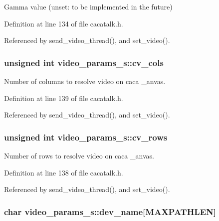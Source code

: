 \-Gamma value (unset\-: to be implemented in the future) 



\-Definition at line 134 of file cacatalk.\-h.



\-Referenced by send\-\_\-video\-\_\-thread(), and set\-\_\-video().

\hypertarget{structvideo__params__s_aa3f695f161a6cc97cdbfbcc7405323ec}{
\subsubsection[{cv\-\_\-cols}]{\setlength{\rightskip}{0pt plus 5cm}unsigned int {\bf video\-\_\-params\-\_\-s\-::cv\-\_\-cols}}}\label{structvideo__params__s_aa3f695f161a6cc97cdbfbcc7405323ec}


\-Number of columns to resolve video on caca \-\_\-anvas. 



\-Definition at line 139 of file cacatalk.\-h.



\-Referenced by send\-\_\-video\-\_\-thread(), and set\-\_\-video().

\hypertarget{structvideo__params__s_aec78c2ac6a99bfb627d77fe7c533541d}{
\subsubsection[{cv\-\_\-rows}]{\setlength{\rightskip}{0pt plus 5cm}unsigned int {\bf video\-\_\-params\-\_\-s\-::cv\-\_\-rows}}}\label{structvideo__params__s_aec78c2ac6a99bfb627d77fe7c533541d}


\-Number of rows to resolve video on caca \-\_\-anvas. 



\-Definition at line 138 of file cacatalk.\-h.



\-Referenced by send\-\_\-video\-\_\-thread(), and set\-\_\-video().

\hypertarget{structvideo__params__s_a7c8bdb370066b647e33e0a84bbca5911}{
\subsubsection[{dev\-\_\-name}]{\setlength{\rightskip}{0pt plus 5cm}char {\bf video\-\_\-params\-\_\-s\-::dev\-\_\-name}\mbox{[}\-M\-A\-X\-P\-A\-T\-H\-L\-E\-N\mbox{]}}}\label{structvideo__params__s_a7c8bdb370066b647e33e0a84bbca5911}


